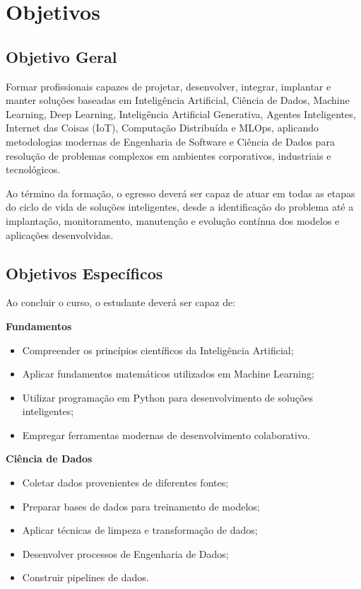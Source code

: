 \chapter{Objetivos}

\section{Objetivo Geral}

Formar profissionais capazes de projetar, desenvolver, integrar, implantar e manter soluções baseadas em Inteligência Artificial, Ciência de Dados, Machine Learning, Deep Learning, Inteligência Artificial Generativa, Agentes Inteligentes, Internet das Coisas (IoT), Computação Distribuída e MLOps, aplicando metodologias modernas de Engenharia de Software e Ciência de Dados para resolução de problemas complexos em ambientes corporativos, industriais e tecnológicos.

Ao término da formação, o egresso deverá ser capaz de atuar em todas as etapas do ciclo de vida de soluções inteligentes, desde a identificação do problema até a implantação, monitoramento, manutenção e evolução contínua dos modelos e aplicações desenvolvidas.

\section{Objetivos Específicos}
Ao concluir o curso, o estudante deverá ser capaz de:

\textbf{Fundamentos}
\begin{itemize}
\item Compreender os princípios científicos da Inteligência Artificial;
\item Aplicar fundamentos matemáticos utilizados em Machine Learning;
\item Utilizar programação em Python para desenvolvimento de soluções inteligentes;
\item Empregar ferramentas modernas de desenvolvimento colaborativo.
\end{itemize}

\textbf{Ciência de Dados}
\begin{itemize}
\item Coletar dados provenientes de diferentes fontes;
\item Preparar bases de dados para treinamento de modelos;
\item Aplicar técnicas de limpeza e transformação de dados;
\item Desenvolver processos de Engenharia de Dados;
\item Construir pipelines de dados.
\end{itemize}

